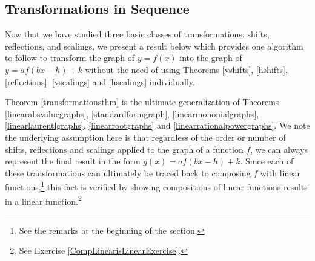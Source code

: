 \documentclass{ximera}
\begin{document}
\subsection{Transformations in Sequence}
\label{TransformationsinSequence}


Now that we have studied  three basic classes of transformations:  shifts, reflections, and scalings, we present a result below which provides one algorithm to follow to transform the graph of $y=f(x)$ into the graph of $y=af(bx-h)+k$ without the need of using Theorems \ref{vshifts}, \ref{hshifts}, \ref{reflections}, \ref{vscalings} and \ref{hscalings} individually.  

\smallskip

Theorem \ref{transformationsthm} is the ultimate generalization of Theorems \ref{linearabsvaluegraphs}, \ref{standardformgraph}, \ref{linearmononialgraphs},  \ref{linearlaurentlgraphs}, \ref{linearrootgraphs} and \ref{linearrationalpowergraphs}.  We note the underlying assumption here is that regardless of the order or number of shifts, reflections and scalings applied to the graph of a function $f$, we can always represent the final result in the form $g(x) = a f(bx-h)+k$.   Since each of these transformations can ultimately be traced back to composing $f$ with linear functions,\footnote{See the remarks at the beginning of the section.} this fact is verified by showing compositions of linear functions results in a linear function.\footnote{See Exercise \ref{CompLinearisLinearExercise}.}

\smallskip


\end{document}
